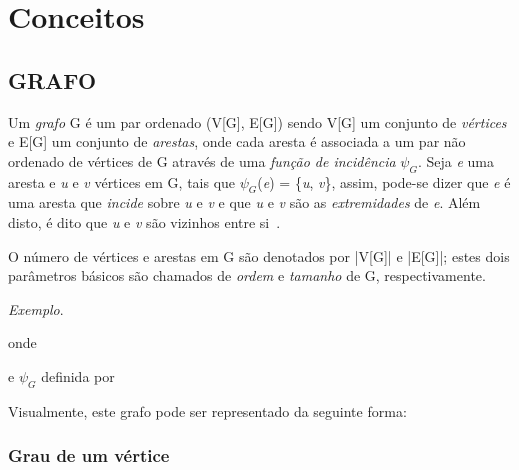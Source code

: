 \chapter{Conceitos}
\label{conceitos}

\section{\texorpdfstring{\MakeUppercase{Grafo}}{}}
\label{conceitos__grafo}

Um \emph{grafo} G é um par ordenado (V[G], E[G]) sendo V[G] um conjunto de \emph{vértices} e E[G] um conjunto de \emph{arestas}, onde cada aresta é associada a um par não ordenado de vértices de G através de uma \emph{função de incidência} $\psi_{G}$. Seja \emph{e} uma aresta e \emph{u} e \emph{v} vértices em G, tais que $\psi_{G}$(\emph{e}) = \{\emph{u}, \emph{v}\}, assim, pode-se dizer que \emph{e} é uma aresta que \emph{incide} sobre \emph{u} e \emph{v} e que \emph{u} e \emph{v} são as \emph{extremidades} de \emph{e}. Além disto, é dito que \emph{u} e \emph{v} são vizinhos entre si~\cite{bondy1976graph}.

O número de vértices e arestas em G são denotados por |V[G]| e |E[G]|; estes
dois parâmetros básicos são chamados de \emph{ordem} e \emph{tamanho} de G, respectivamente.

\noindent\emph{Exemplo}.


\noindent onde



\noindent e $\psi_{G}$ definida por



Visualmente, este grafo pode ser representado da seguinte forma:


\subsection{Grau de um vértice}
\label{conceitos__grafo--grau}

